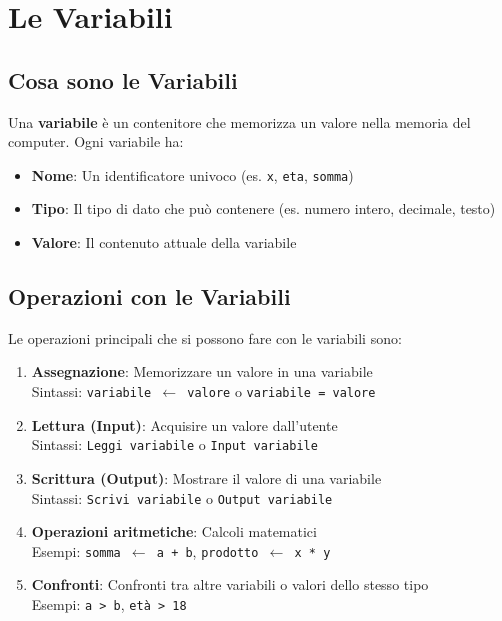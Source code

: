 \documentclass[a4paper,16pt]{article}
\begin{document}
\newpage
\section{Le Variabili}

\subsection{Cosa sono le Variabili}

Una \textbf{variabile} è un contenitore che memorizza un valore nella memoria del computer. Ogni variabile ha:

\begin{itemize}[leftmargin=*]
    \item \textbf{Nome}: Un identificatore univoco (es. \texttt{x}, \texttt{eta}, \texttt{somma})
    \item \textbf{Tipo}: Il tipo di dato che può contenere (es. numero intero, decimale, testo)
    \item \textbf{Valore}: Il contenuto attuale della variabile
\end{itemize}

\subsection{Operazioni con le Variabili}

Le operazioni principali che si possono fare con le variabili sono:

\begin{enumerate}[leftmargin=*]
    \item \textbf{Assegnazione}: Memorizzare un valore in una variabile\\
    Sintassi: \texttt{variabile $\leftarrow$ valore} o \texttt{variabile = valore}
    
    \item \textbf{Lettura (Input)}: Acquisire un valore dall'utente\\
    Sintassi: \texttt{Leggi variabile} o \texttt{Input variabile}
    
    \item \textbf{Scrittura (Output)}: Mostrare il valore di una variabile\\
    Sintassi: \texttt{Scrivi variabile} o \texttt{Output variabile}
    
    \item \textbf{Operazioni aritmetiche}: Calcoli matematici\\
    Esempi: \texttt{somma $\leftarrow$ a + b}, \texttt{prodotto $\leftarrow$ x * y}

    \item \textbf{Confronti}: Confronti tra altre variabili o valori dello stesso tipo\\
    Esempi: \texttt{a > b}, \texttt{età > 18}
\end{enumerate}
\end{document}
